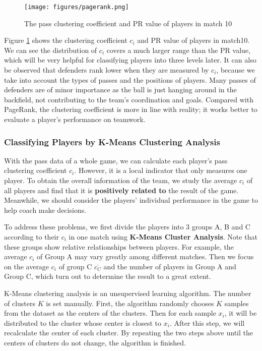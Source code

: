 \documentclass{mcmthesis}
\begin{document}
\begin{figure}[htp]
  \centering
  \texttt{[image: figures/pagerank.png]}
  \caption{The pass clustering coefficient and PR value of players in match 10}\label{pagerank}
\end{figure}

Figure \ref{pagerank} shows the clustering coefficient $c_{i}$ and PR value of players in match10. We can see the distribution of $c_{i}$ covers a much larger range than the PR value, which will be very helpful for classifying players into three levels later. It can also be observed that defenders rank lower when they are measured by $c_{i}$, because we take into account the types of passes and the positions of players. Many passes of defenders are of minor importance as the ball is just hanging around in the backfield, not contributing to the team's coordination and goals. Compared with PageRank, the clustering coefficient is more in line with reality; it works better to evaluate a player's performance on teamwork.

\subsubsection{Classifying Players by K-Means Clustering Analysis} \label{K-means}
With the pass data of a whole game, we can calculate each player's pass clustering coefficient $c_{i}$. However, it is a local indicator that only measures one player. To obtain the overall information of the team, we study the average $c_{i}$ of all players and find that it is \textbf{positively related to} the result of the game. Meanwhile, we should consider the players' individual performance in the game to help coach make decisions.

To address these problems, we first divide the players into 3 groups A, B and C according to their $c_{i}$ in one match using \textbf{K-Means Cluster Analysis}. Note that these groups show relative relationships between players. For example, the average $c_{i}$ of Group A may vary greatly among different matches. Then we focus on the average $c_{i}$ of group C $\overline{c_{C}}$ and the number of players in Group A and Group C, which turn out to determine the result to a great extent.

K-Means clustering analysis is an unsupervised learning algorithm. The number of clusters $K$ is set manually. First, the algorithm randomly chooses $K$ samples from the dataset as the centers of the clusters. Then for each sample $x_{i}$, it will be distributed to the cluster whose center is closest to $x_{i}$. After this step, we will recalculate the center of each cluster. By repeating the two steps above until the centers of clusters do not change, the algorithm is finished.
\end{document}
